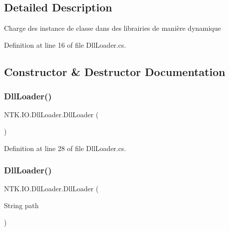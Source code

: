 \subsection{Detailed Description}
Charge des instance de classe dans des librairies de manière dynamique 



Definition at line 16 of file Dll\+Loader.\+cs.



\subsection{Constructor \& Destructor Documentation}
\mbox{\label{class_n_t_k_1_1_i_o_1_1_dll_loader_ab520650d43c7a587abae9920b4557a21}} 
\subsubsection{\texorpdfstring{DllLoader()}{DllLoader()}\hspace{0.1cm}{\footnotesize\ttfamily [1/2]}}
{\footnotesize\ttfamily N\+T\+K.\+I\+O.\+Dll\+Loader.\+Dll\+Loader (\begin{DoxyParamCaption}{ }\end{DoxyParamCaption})}







Definition at line 28 of file Dll\+Loader.\+cs.

\mbox{\label{class_n_t_k_1_1_i_o_1_1_dll_loader_a5bc3e186eb39dfa7f2d5b3ea9e108271}} 
\subsubsection{\texorpdfstring{DllLoader()}{DllLoader()}\hspace{0.1cm}{\footnotesize\ttfamily [2/2]}}
{\footnotesize\ttfamily N\+T\+K.\+I\+O.\+Dll\+Loader.\+Dll\+Loader (\begin{DoxyParamCaption}\item[{String}]{path }\end{DoxyParamCaption})}







